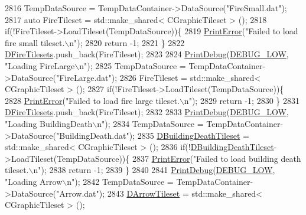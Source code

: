 \begin{DoxyCode}
2816     TempDataSource = TempDataContainer->DataSource(\textcolor{stringliteral}{"FireSmall.dat"});
2817     \textcolor{keyword}{auto} FireTileset = std::make\_shared< CGraphicTileset > ();
2818     \textcolor{keywordflow}{if}(!FireTileset->LoadTileset(TempDataSource))\{
2819         \hyperlink{Debug_8h_a2ed825eefefe35baf59a93a8c641323d}{PrintError}(\textcolor{stringliteral}{"Failed to load fire small tileset.\(\backslash\)n"});
2820         \textcolor{keywordflow}{return} -1;
2821     \}
2822     \hyperlink{classCApplicationData_a68f7be36ab8b46ea7fca3bd3e79784cd}{DFireTilesets}.push\_back(FireTileset);
2823     
2824     \hyperlink{Debug_8h_aa5f00f5537c9760f6ae1782460748ab9}{PrintDebug}(\hyperlink{Debug_8h_a3a5f3fc09784650d8388cb854882f840}{DEBUG\_LOW}, \textcolor{stringliteral}{"Loading FireLarge\(\backslash\)n"});
2825     TempDataSource = TempDataContainer->DataSource(\textcolor{stringliteral}{"FireLarge.dat"});
2826     FireTileset = std::make\_shared< CGraphicTileset > ();
2827     \textcolor{keywordflow}{if}(!FireTileset->LoadTileset(TempDataSource))\{
2828         \hyperlink{Debug_8h_a2ed825eefefe35baf59a93a8c641323d}{PrintError}(\textcolor{stringliteral}{"Failed to load fire large tileset.\(\backslash\)n"});
2829         \textcolor{keywordflow}{return} -1;
2830     \}
2831     \hyperlink{classCApplicationData_a68f7be36ab8b46ea7fca3bd3e79784cd}{DFireTilesets}.push\_back(FireTileset);
2832     
2833     \hyperlink{Debug_8h_aa5f00f5537c9760f6ae1782460748ab9}{PrintDebug}(\hyperlink{Debug_8h_a3a5f3fc09784650d8388cb854882f840}{DEBUG\_LOW}, \textcolor{stringliteral}{"Loading BuildingDeath\(\backslash\)n"});
2834     TempDataSource = TempDataContainer->DataSource(\textcolor{stringliteral}{"BuildingDeath.dat"});
2835     \hyperlink{classCApplicationData_ab463f816076fec8d43ecfe61120e8e6b}{DBuildingDeathTileset} = std::make\_shared< CGraphicTileset > ();
2836     \textcolor{keywordflow}{if}(!\hyperlink{classCApplicationData_ab463f816076fec8d43ecfe61120e8e6b}{DBuildingDeathTileset}->LoadTileset(TempDataSource))\{
2837         \hyperlink{Debug_8h_a2ed825eefefe35baf59a93a8c641323d}{PrintError}(\textcolor{stringliteral}{"Failed to load building death tileset.\(\backslash\)n"});
2838         \textcolor{keywordflow}{return} -1;
2839     \}
2840     
2841     \hyperlink{Debug_8h_aa5f00f5537c9760f6ae1782460748ab9}{PrintDebug}(\hyperlink{Debug_8h_a3a5f3fc09784650d8388cb854882f840}{DEBUG\_LOW}, \textcolor{stringliteral}{"Loading Arrow\(\backslash\)n"});
2842     TempDataSource = TempDataContainer->DataSource(\textcolor{stringliteral}{"Arrow.dat"});
2843     \hyperlink{classCApplicationData_a5c617fcea02a399ecffee313eead2159}{DArrowTileset} = std::make\_shared< CGraphicTileset > ();

\end{DoxyCode}
